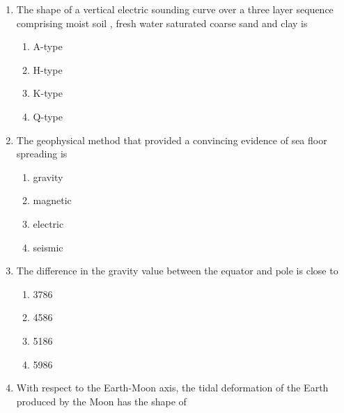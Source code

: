 \documentclass[journal,12pt,onecolumn]{IEEEtran}
\theoremstyle{remark}
\begin{document}
\begin{enumerate}
    \item The shape of a vertical electric sounding curve over a three layer sequence comprising moist soil , fresh water saturated coarse sand  and clay  is

    \hfill{}
    
    \begin{multicols}{4}
        \begin{enumerate}
            \item A-type
            \item H-type
            \item K-type
            \item Q-type
        \end{enumerate}
    \end{multicols}

    \item The geophysical method that provided a convincing evidence of sea floor spreading is

    \hfill{}
    
    \begin{multicols}{4}
        \begin{enumerate}
            \item gravity
            \item magnetic
            \item electric
            \item seismic
        \end{enumerate}
    \end{multicols}

    \item The difference in the gravity value  between the equator and pole is close to

    \hfill{}
    
    \begin{multicols}{4}
        \begin{enumerate}
            \item 3786
            \item 4586
            \item 5186
            \item 5986
        \end{enumerate}
    \end{multicols}

    \item With respect to the Earth-Moon axis, the tidal deformation of the Earth produced by the Moon has the shape of


\end{enumerate}
\end{document}
